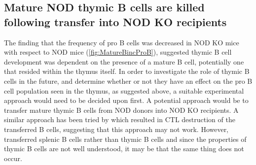 

\subsection{Mature NOD thymic B cells are killed following transfer into NOD KO recipients}

The finding that the frequency of pro B cells was decreased in NOD KO mice with respect to NOD mice (\cref{fig:MatureBincProB}), suggested thymic B cell development was dependent on the presence of a mature B cell, potentially one that resided within the thymus itself.
In order to investigate the role of thymic B cells in the future, and determine whether or not they have an effect on the pro B cell population seen in the thymus, as suggested above, a suitable experimental approach would need to be decided upon first.
A potential approach would be to transfer mature thymic B cells from NOD donors into NOD KO recipients.
A similar approach has been tried by \citet{Serreze1998} which resulted in CTL destruction of the transferred B cells, suggesting that this approach may not work.
However, \citet{Serreze1998} transferred splenic B cells rather than thymic B cells and since the properties of thymic B cells are not well understood, it may be that the same thing does not occur.

